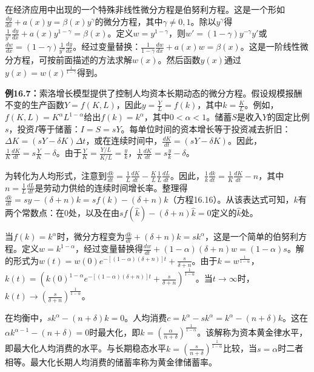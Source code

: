 \begin{translation}
在经济应用中出现的一个特殊非线性微分方程是伯努利方程。这是一个形如$\frac{d y}{dx} + a(x)y = \beta(x)y^{\gamma}$的微分方程，其中$\gamma \neq 0, 1$。除以$y^{\gamma}$得$\frac{1}{y^{\gamma}}\frac{dy}{dx} + a(x) y^{1-\gamma} = \beta(x)$。定义$w = y^{1-\gamma}$，则$w' = (1 - \gamma) y^{-\gamma} y'$或$\frac{dw}{dx} = (1 - \gamma) \frac{1}{y^{\gamma}}\frac{dy}{dx}$。经过变量替换：$\frac{1}{1 - \gamma}\frac{dw}{dx} + a(x)w = \beta(x)$。这是一阶线性微分方程，可按前面描述的方法求解$w(x)$。然后函数$y(x)$通过$y(x) = w(x)^{\frac{1}{1-\gamma}}$得到。

\textbf{例16.7：}索洛增长模型提供了控制人均资本长期动态的微分方程。假设规模报酬不变的生产函数$Y = f(K, L)$，因此$y = \frac{Y}{L} = f(k)$，其中$k = \frac{K}{L}$。例如，$f(K, L) = K^{\alpha} L^{1-\alpha}$给出$f(k) = k^{\alpha}$，其中$0 < \alpha < 1$。储蓄$S$是收入$Y$的固定比例$s$，投资$I$等于储蓄：$I = S = sY$。每单位时间的资本增长等于投资减去折旧：$\Delta K = (sY - \delta K)\Delta t$，或在连续时间中，$\frac{dK}{dt} = (sY - \delta K)$。因此，$\frac{1}{K}\frac{dK}{dt} = s\frac{Y}{K} - \delta$。由于$\frac{Y}{K} = \frac{Y/L}{K/L} = \frac{y}{k}$，$\frac{1}{K}\frac{dK}{dt} = s\frac{y}{k} - \delta$。

为转化为人均形式，注意到$\frac{dk}{dt} = \frac{1}{L}\frac{dK}{dt} - \frac{K}{L}\frac{1}{L}\frac{dL}{dt}$。因此，$\frac{1}{k}\frac{dk}{dt} = \frac{1}{K}\frac{dK}{dt} - n$，其中$n = \frac{1}{L}\frac{dL}{dt}$是劳动力供给的连续时间增长率。整理得$\frac{dk}{dt} = sy - (\delta + n)k = s f(k) - (\delta + n)k$（方程16.16）。从该表达式可知，$k$有两个常数点：在$0$处，以及在由$s f(\hat{k}) - (\delta + n)\hat{k} = 0$定义的$\hat{k}$处。

当$f(k) = k^{\alpha}$时，微分方程变为$\frac{dk}{dt} + (\delta + n)k = sk^{\alpha}$，这是一个简单的伯努利方程。定义$w = k^{1-\alpha}$，经过变量替换得$\frac{dw}{dt} + (1 - \alpha)(\delta + n)w = (1 - \alpha)s$。解的形式为$w(t) = w(0)e^{-[(1-\alpha)(\delta+n)]t} + \frac{s}{\delta + n}$。由于$k = w^{\frac{1}{1-\alpha}}$，$k(t) = (k(0)^{1-\alpha} e^{-[(1-\alpha)(\delta+n)]t} + \frac{s}{\delta + n})^{\frac{1}{1-\alpha}}$。当$t \to \infty$时，$k(t) \to (\frac{s}{\delta + n})^{\frac{1}{1-\alpha}}$。

在均衡中，$sk^{\alpha} - (n + \delta)k = 0$。人均消费$c = k^{\alpha} - sk^{\alpha} = k^{\alpha} - (n + \delta)k$。这在$\alpha k^{\alpha-1} - (n + \delta) = 0$时最大化，即$k = (\frac{\alpha}{n + \delta})^{\frac{1}{1-\alpha}}$。该解称为资本黄金律水平，即最大化人均消费的水平。与长期稳态水平$k = (\frac{s}{n+\delta})^{\frac{1}{1-\alpha}}$比较，当$s = \alpha$时二者相等。最大化长期人均消费的储蓄率称为黄金律储蓄率。
\end{translation}
